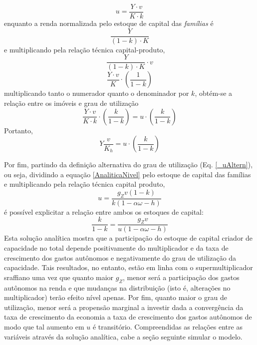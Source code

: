 \begin{equation}
\label{_uAltern}
    u = \frac{Y\cdot v}{K \cdot k}
\end{equation}
enquanto a renda normalizada pelo estoque de capital das \textit{famílias} é
$$
\frac{Y}{(1-k)\cdot K}
$$
e multiplicando pela relação técnica capital-produto,
$$
\frac{Y}{(1-k)\cdot K}\cdot v 
$$
$$
\frac{Y\cdot v}{K}\cdot \left(\frac{1}{1-k}\right)
$$
multiplicando tanto o numerador quanto o denominador por $k$, obtém-se a relação entre os imóveis e grau de utilização
$$
\frac{Y\cdot v}{K\cdot k}\cdot \left(\frac{k}{1-k}\right) = u \cdot \left(\frac{k}{1-k}\right)
$$
Portanto,
$$
Y\frac{v}{K_h} =  u \cdot \left(\frac{k}{1-k}\right)
$$

Por fim, partindo da definição alternativa do grau de utilização (Eq. \ref{_uAltern}), ou seja, dividindo a equação \ref{AnaliticaNivel} pelo estoque de capital das famílias e multiplicando pela relação técnica capital produto,
$$
u = \frac{g_Z v (1-k)}{k (1 - \alpha \omega - h)}
$$
é possível explicitar a relação entre ambos os estoques de capital:
\begin{equation}
    \label{AnaliticaTau}
    \frac{k}{1-k} = \frac{g_Z v}{u (1-\alpha \omega - h)}
\end{equation}
Esta solução analítica mostra que a participação do estoque de capital criador de capacidade no total depende positivamente do multiplicador e da taxa de crescimento dos gastos autônomos e negativamente do grau de utilização da capacidade. Tais resultados, no entanto, estão em linha com o supermultiplicador sraffiano uma vez que quanto maior $g_Z$, menor será a participação dos gastos autônomos na renda e que mudanças na distribuição (isto é, alterações no multiplicador) terão efeito nível apenas. Por fim, quanto maior o grau de utilização, menor será a propensão marginal a investir dada a convergência da taxa de crescimento da economia a taxa de crescimento dos gastos autônomos de modo que tal aumento em $u$ é transitório. Compreendidas as relações entre as variáveis através da solução analítica, cabe a seção seguinte simular o modelo.